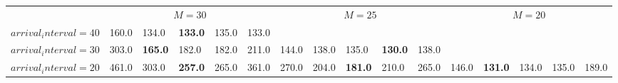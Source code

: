 \begin{tabular}{l  | l l l l l  | l l l l l  | l l l l l }
& \multicolumn{5}{c}{$M=30$} & \multicolumn{5}{c}{$M=25$} & \multicolumn{5}{c}{$M=20$} \\
$arrival_interval=40$ & 160.0 & 134.0 & \textbf{133.0} & 135.0 & 133.0 &  &  &  &  &  &  &  &  &  &  \\
$arrival_interval=30$ & 303.0 & \textbf{165.0} & 182.0 & 182.0 & 211.0 & 144.0 & 138.0 & 135.0 & \textbf{130.0} & 138.0 &  &  &  &  &  \\
$arrival_interval=20$ & 461.0 & 303.0 & \textbf{257.0} & 265.0 & 361.0 & 270.0 & 204.0 & \textbf{181.0} & 210.0 & 265.0 & 146.0 & \textbf{131.0} & 134.0 & 135.0 & 189.0
\end{tabular}